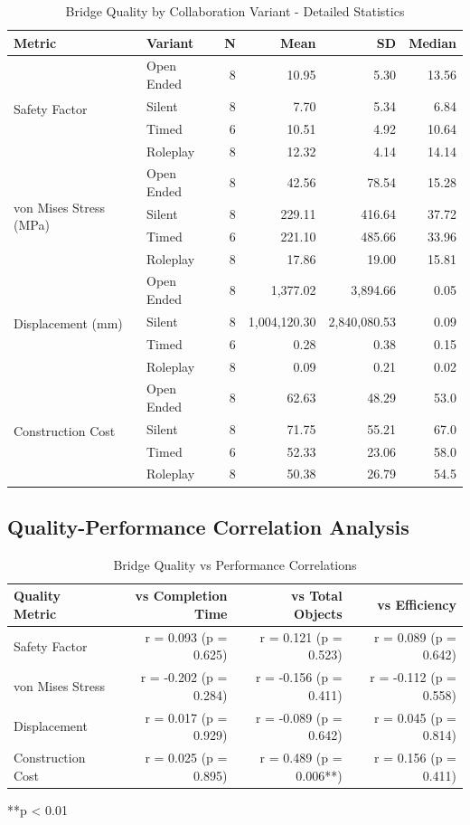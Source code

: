 \begin{table}[H]
\centering
\caption{Bridge Quality by Collaboration Variant - Detailed Statistics}
\label{tab:bridge_quality_by_variant_complete}
\begin{tabular}{llrrrr}
\toprule
\textbf{Metric} & \textbf{Variant} & \textbf{N} & \textbf{Mean} & \textbf{SD} & \textbf{Median} \\
\midrule
\multirow{4}{*}{Safety Factor} & Open Ended & 8 & 10.95 & 5.30 & 13.56 \\
& Silent & 8 & 7.70 & 5.34 & 6.84 \\
& Timed & 6 & 10.51 & 4.92 & 10.64 \\
& Roleplay & 8 & 12.32 & 4.14 & 14.14 \\
\midrule
\multirow{4}{*}{von Mises Stress (MPa)} & Open Ended & 8 & 42.56 & 78.54 & 15.28 \\
& Silent & 8 & 229.11 & 416.64 & 37.72 \\
& Timed & 6 & 221.10 & 485.66 & 33.96 \\
& Roleplay & 8 & 17.86 & 19.00 & 15.81 \\
\midrule
\multirow{4}{*}{Displacement (mm)} & Open Ended & 8 & 1,377.02 & 3,894.66 & 0.05 \\
& Silent & 8 & 1,004,120.30 & 2,840,080.53 & 0.09 \\
& Timed & 6 & 0.28 & 0.38 & 0.15 \\
& Roleplay & 8 & 0.09 & 0.21 & 0.02 \\
\midrule
\multirow{4}{*}{Construction Cost} & Open Ended & 8 & 62.63 & 48.29 & 53.0 \\
& Silent & 8 & 71.75 & 55.21 & 67.0 \\
& Timed & 6 & 52.33 & 23.06 & 58.0 \\
& Roleplay & 8 & 50.38 & 26.79 & 54.5 \\
\bottomrule
\end{tabular}
\end{table}

\subsection{Quality-Performance Correlation Analysis}

\begin{table}[H]
\centering
\caption{Bridge Quality vs Performance Correlations}
\label{tab:quality_performance_correlations}
\begin{tabular}{lrrr}
\toprule
\textbf{Quality Metric} & \textbf{vs Completion Time} & \textbf{vs Total Objects} & \textbf{vs Efficiency} \\
\midrule
Safety Factor & r = 0.093 (p = 0.625) & r = 0.121 (p = 0.523) & r = 0.089 (p = 0.642) \\
von Mises Stress & r = -0.202 (p = 0.284) & r = -0.156 (p = 0.411) & r = -0.112 (p = 0.558) \\
Displacement & r = 0.017 (p = 0.929) & r = -0.089 (p = 0.642) & r = 0.045 (p = 0.814) \\
Construction Cost & r = 0.025 (p = 0.895) & r = 0.489 (p = 0.006**) & r = 0.156 (p = 0.411) \\
\bottomrule
\end{tabular}
\small
**p < 0.01
\end{table}

